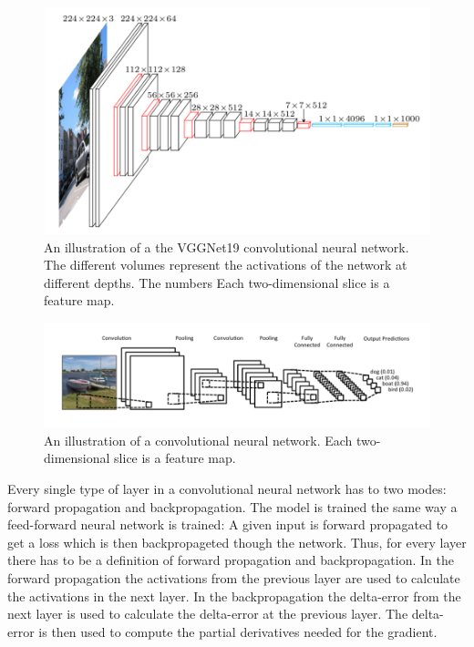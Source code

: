 \documentclass[a4paper,11pt,twoside]{article}
\begin{document}
\begin{figure}[h]
	\centering
  		\includegraphics[scale=0.6]{vggnet.png}
  	\caption{An illustration of a the VGGNet19 convolutional neural network. The different volumes represent the activations of the network at different depths. The numbers  Each two-dimensional slice is a feature map. \cite{vgg}} \label{cs231n}
\end{figure}

\begin{figure}[h]
	\centering
  		\includegraphics[scale=0.6]{boatcnn.png}
  	\caption{An illustration of a convolutional neural network. Each two-dimensional slice is a feature map. \cite{figboatcnn}}\label{figboatcnn}
\end{figure}

Every single type of layer in a convolutional neural network has to two modes: forward propagation and backpropagation. The model is trained the same way a feed-forward neural network is trained: A given input is forward propagated to get a loss which is then backpropageted though the network. Thus, for every layer there has to be a definition of forward propagation and backpropagation. In the forward propagation the activations from the previous layer are used to calculate the activations in the next layer. In the backpropagation the delta-error from the next layer is used to calculate the delta-error at the previous layer. The delta-error is then used to compute the partial derivatives needed for the gradient. \cite{cs231n} \cite{convmath}
\end{document}
